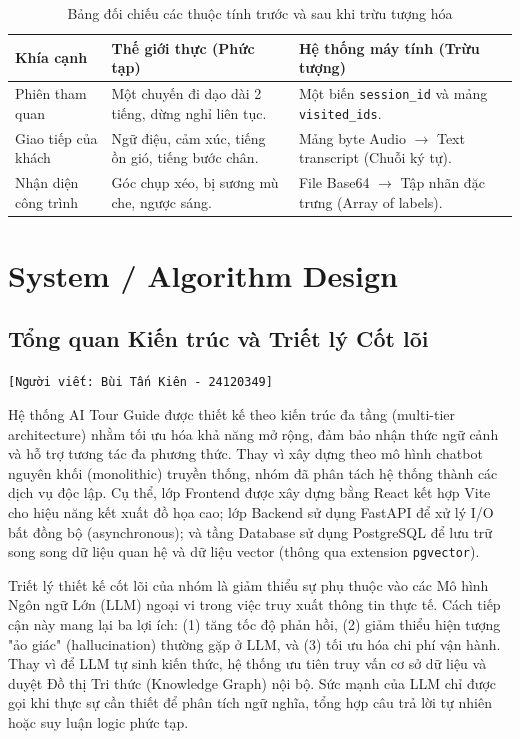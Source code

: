 \begin{table}[H]
    \centering
    \renewcommand{\arraystretch}{1.4}
    \begin{tabular}{|p{4cm}|p{5cm}|p{5cm}|}
        \hline
        \textbf{Khía cạnh} & \textbf{Thế giới thực (Phức tạp)} & \textbf{Hệ thống máy tính (Trừu tượng)} \\ \hline
        Phiên tham quan & Một chuyến đi dạo dài 2 tiếng, dừng nghỉ liên tục. & Một biến \texttt{session\_id} và mảng \texttt{visited\_ids}. \\ \hline
        Giao tiếp của khách & Ngữ điệu, cảm xúc, tiếng ồn gió, tiếng bước chân. & Mảng byte Audio $\rightarrow$ Text transcript (Chuỗi ký tự). \\ \hline
        Nhận diện công trình & Góc chụp xéo, bị sương mù che, ngược sáng. & File Base64 $\rightarrow$ Tập nhãn đặc trưng (Array of labels). \\ \hline
    \end{tabular}
    \caption{Bảng đối chiếu các thuộc tính trước và sau khi trừu tượng hóa}
\end{table}

\section{System / Algorithm Design}
\subsection{Tổng quan Kiến trúc và Triết lý Cốt lõi}
\texttt{[Người viết: Bùi Tấn Kiên - 24120349]}

Hệ thống AI Tour Guide được thiết kế theo kiến trúc đa tầng (multi-tier architecture) nhằm tối ưu hóa khả năng mở rộng, đảm bảo nhận thức ngữ cảnh và hỗ trợ tương tác đa phương thức. Thay vì xây dựng theo mô hình chatbot nguyên khối (monolithic) truyền thống, nhóm đã phân tách hệ thống thành các dịch vụ độc lập. Cụ thể, lớp Frontend được xây dựng bằng React kết hợp Vite cho hiệu năng kết xuất đồ họa cao; lớp Backend sử dụng FastAPI để xử lý I/O bất đồng bộ (asynchronous); và tầng Database sử dụng PostgreSQL để lưu trữ song song dữ liệu quan hệ và dữ liệu vector (thông qua extension \texttt{pgvector}).

Triết lý thiết kế cốt lõi của nhóm là giảm thiểu sự phụ thuộc vào các Mô hình Ngôn ngữ Lớn (LLM) ngoại vi trong việc truy xuất thông tin thực tế. Cách tiếp cận này mang lại ba lợi ích: (1) tăng tốc độ phản hồi, (2) giảm thiểu hiện tượng "ảo giác" (hallucination) thường gặp ở LLM, và (3) tối ưu hóa chi phí vận hành. Thay vì để LLM tự sinh kiến thức, hệ thống ưu tiên truy vấn cơ sở dữ liệu và duyệt Đồ thị Tri thức (Knowledge Graph) nội bộ. Sức mạnh của LLM chỉ được gọi khi thực sự cần thiết để phân tích ngữ nghĩa, tổng hợp câu trả lời tự nhiên hoặc suy luận logic phức tạp.

